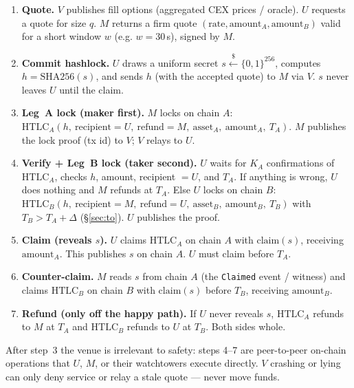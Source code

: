 \documentclass[11pt]{article}
\begin{document}
\begin{enumerate}[leftmargin=2.2em]
  \item \textbf{Quote.} $V$ publishes fill options (aggregated CEX prices /
        oracle). $U$ requests a quote for size $q$. $M$ returns a firm quote
        $(\text{rate}, \text{amount}_A, \text{amount}_B)$ valid for a short
        window $w$ (e.g. $w=30$\,s), signed by $M$.
  \item \textbf{Commit hashlock.} $U$ draws a uniform secret
        $s \xleftarrow{\$} \{0,1\}^{256}$, computes $h=\mathrm{SHA256}(s)$, and
        sends $h$ (with the accepted quote) to $M$ via $V$. $s$ never leaves
        $U$ until the claim.
  \item \textbf{Leg~A lock (maker first).} $M$ locks on chain $A$:
        $\mathrm{HTLC}_A(h,\ \text{recipient}=U,\ \text{refund}=M,\
        \text{asset}_A,\ \text{amount}_A,\ T_A)$. $M$ publishes the lock
        proof (tx id) to $V$; $V$ relays to $U$.
  \item \textbf{Verify + Leg~B lock (taker second).} $U$ waits for
        $K_A$ confirmations of $\mathrm{HTLC}_A$, checks $h$, amount, recipient
        $=U$, and $T_A$. If anything is wrong, $U$ does nothing and $M$ refunds
        at $T_A$. Else $U$ locks on chain $B$:
        $\mathrm{HTLC}_B(h,\ \text{recipient}=M,\ \text{refund}=U,\
        \text{asset}_B,\ \text{amount}_B,\ T_B)$ with $T_B > T_A + \Delta$
        (\S\ref{sec:to}). $U$ publishes the proof.
  \item \textbf{Claim (reveals $s$).} $U$ claims $\mathrm{HTLC}_A$ on chain $A$
        with $\mathrm{claim}(s)$, receiving $\text{amount}_A$. This publishes
        $s$ on chain $A$. $U$ must claim before $T_A$.
  \item \textbf{Counter-claim.} $M$ reads $s$ from chain $A$ (the
        \texttt{Claimed} event / witness) and claims $\mathrm{HTLC}_B$ on chain
        $B$ with $\mathrm{claim}(s)$ before $T_B$, receiving $\text{amount}_B$.
  \item \textbf{Refund (only off the happy path).} If $U$ never reveals $s$,
        $\mathrm{HTLC}_A$ refunds to $M$ at $T_A$ and $\mathrm{HTLC}_B$ refunds
        to $U$ at $T_B$. Both sides whole.
\end{enumerate}

After step~3 the venue is irrelevant to safety: steps 4--7 are peer-to-peer
on-chain operations that $U$, $M$, or their watchtowers execute directly. $V$
crashing or lying can only deny service or relay a stale quote --- never move
funds.
\end{document}
